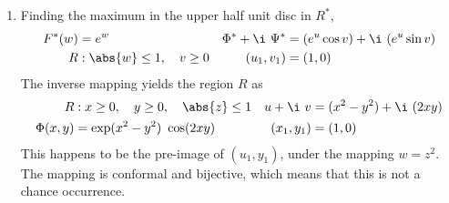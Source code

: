 \begin{enumerate}
    \item Finding the maximum in the upper half unit disc in $ R^* $,
          \begin{align}
              F^*(w)              & = e^w                             &
              \Phi^* + \i\ \Psi^* & = (e^u \cos v) + \i\ (e^u \sin v)   \\
              R                   & : \abs{w} \leq 1, \quad v \geq 0  &
              (u_1, v_1)          & = (1, 0)
          \end{align}
          The inverse mapping yields the region $ R $ as
          \begin{align}
              R          & : x \geq 0, \quad y \geq 0, \quad \abs{z} \leq 1 &
              u + \i\ v  & = (x^2 - y^2) + \i\ (2xy)                          \\
              \Phi(x, y) & = \exp(x^2 - y^2)\ \cos(2xy)                     &
              (x_1, y_1) & = (1, 0)
          \end{align}
          This happens to be the pre-image of $ (u_1, y_1) $, under the mapping
          $ w = z^2 $. The mapping is conformal and bijective, which means that this is
          not a chance occurrence.
\end{enumerate}
